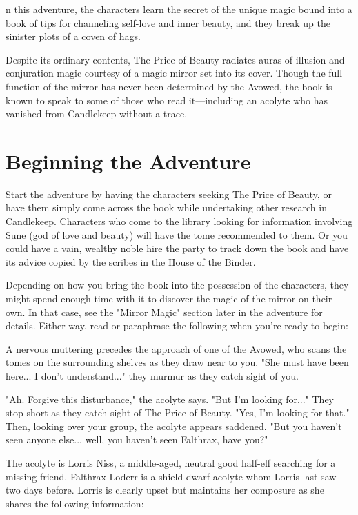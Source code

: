 \documentclass[10pt,a4paper,twoside,bg=print,twocolumn,openany,nodeprecatedcode]{dndbook}
\begin{document}
n this adventure, the characters learn the secret of the unique magic bound into a book of tips for channeling self-love and inner beauty, and they break up the sinister plots of a coven of hags.


Despite its ordinary contents, The Price of Beauty radiates auras of illusion and conjuration magic courtesy of a magic mirror set into its cover. Though the full function of the mirror has never been determined by the Avowed, the book is known to speak to some of those who read it—including an acolyte who has vanished from Candlekeep without a trace.

\section{Beginning the Adventure}
Start the adventure by having the characters seeking The Price of Beauty, or have them simply come across the book while undertaking other research in Candlekeep. Characters who come to the library looking for information involving Sune (god of love and beauty) will have the tome recommended to them. Or you could have a vain, wealthy noble hire the party to track down the book and have its advice copied by the scribes in the House of the Binder.

Depending on how you bring the book into the possession of the characters, they might spend enough time with it to discover the magic of the mirror on their own. In that case, see the "Mirror Magic" section later in the adventure for details. Either way, read or paraphrase the following when you're ready to begin:

\begin{DndReadAloud}{}
A nervous muttering precedes the approach of one of the Avowed, who scans the tomes on the surrounding shelves as they draw near to you. "She must have been here... I don't understand..." they murmur as they catch sight of you.

"Ah. Forgive this disturbance," the acolyte says. "But I'm looking for..." They stop short as they catch sight of The Price of Beauty. "Yes, I'm looking for that." Then, looking over your group, the acolyte appears saddened. "But you haven't seen anyone else... well, you haven't seen Falthrax, have you?"

\end{DndReadAloud}

The acolyte is Lorris Niss, a middle-aged, neutral good half-elf searching for a missing friend. Falthrax Loderr is a shield dwarf acolyte whom Lorris last saw two days before. Lorris is clearly upset but maintains her composure as she shares the following information:
\end{document}
